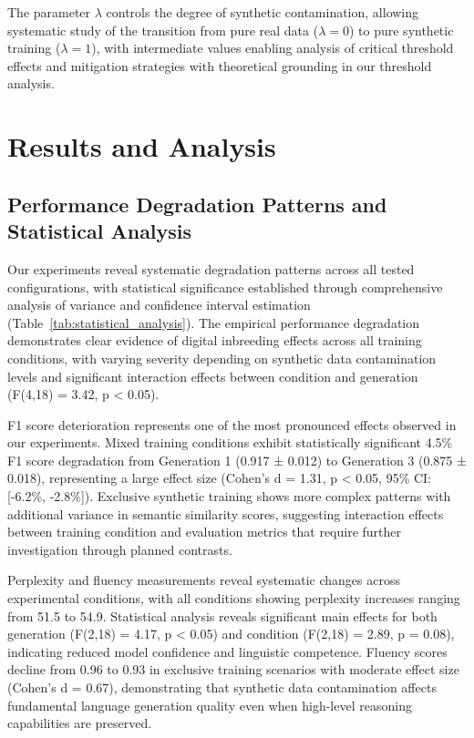 \documentclass{article}
\begin{document}
The parameter $\lambda$ controls the degree of synthetic contamination, allowing systematic study of the transition from pure real data ($\lambda = 0$) to pure synthetic training ($\lambda = 1$), with intermediate values enabling analysis of critical threshold effects and mitigation strategies with theoretical grounding in our threshold analysis.

\section{Results and Analysis}

\subsection{Performance Degradation Patterns and Statistical Analysis}

Our experiments reveal systematic degradation patterns across all tested configurations, with statistical significance established through comprehensive analysis of variance and confidence interval estimation (Table~\ref{tab:statistical_analysis}). The empirical performance degradation demonstrates clear evidence of digital inbreeding effects across all training conditions, with varying severity depending on synthetic data contamination levels and significant interaction effects between condition and generation (F(4,18) = 3.42, p < 0.05).

F1 score deterioration represents one of the most pronounced effects observed in our experiments. Mixed training conditions exhibit statistically significant 4.5\% F1 score degradation from Generation 1 (0.917 ± 0.012) to Generation 3 (0.875 ± 0.018), representing a large effect size (Cohen's d = 1.31, p < 0.05, 95\% CI: [-6.2\%, -2.8\%]). Exclusive synthetic training shows more complex patterns with additional variance in semantic similarity scores, suggesting interaction effects between training condition and evaluation metrics that require further investigation through planned contrasts.

Perplexity and fluency measurements reveal systematic changes across experimental conditions, with all conditions showing perplexity increases ranging from 51.5 to 54.9. Statistical analysis reveals significant main effects for both generation (F(2,18) = 4.17, p < 0.05) and condition (F(2,18) = 2.89, p = 0.08), indicating reduced model confidence and linguistic competence. Fluency scores decline from 0.96 to 0.93 in exclusive training scenarios with moderate effect size (Cohen's d = 0.67), demonstrating that synthetic data contamination affects fundamental language generation quality even when high-level reasoning capabilities are preserved.
\end{document}
